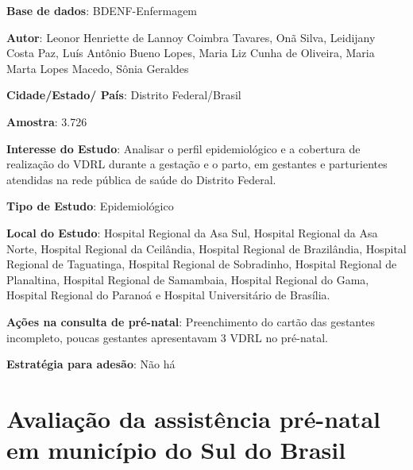 \begin{description}
\item \textbf{Base de dados}: BDENF-Enfermagem
\item \textbf{Autor}:     Leonor Henriette de Lannoy Coimbra Tavares, Onã Silva, Leidijany Costa Paz, Luís Antônio Bueno Lopes, Maria Liz Cunha de Oliveira, Maria Marta Lopes Macedo, Sônia Geraldes
\item \textbf{Cidade/Estado/ País}: Distrito Federal/Brasil
\item \textbf{Amostra}: 3.726
\item \textbf{Interesse do Estudo}: Analisar o perfil epidemiológico e a cobertura de realização do VDRL durante a gestação e o parto, em gestantes e parturientes atendidas na rede pública de saúde do Distrito Federal.
\item \textbf{Tipo de Estudo}: Epidemiológico
\item \textbf{Local do Estudo}: Hospital Regional da Asa Sul, Hospital Regional da Asa Norte, Hospital Regional da Ceilândia, Hospital Regional de Brazilândia, Hospital Regional de Taguatinga, Hospital Regional de Sobradinho, Hospital Regional de Planaltina, Hospital Regional de Samambaia, Hospital Regional do Gama,  Hospital Regional do Paranoá e Hospital Universitário de Brasília.
\item \textbf{Ações na consulta de pré-natal}: Preenchimento do cartão das gestantes incompleto, poucas gestantes apresentavam 3 VDRL no pré-natal. 
\item \textbf{Estratégia para adesão}: Não há
\end{description}

\section{Avaliação da assistência pré-natal em município do Sul do Brasil \cite{segatto2015evaluation}}

